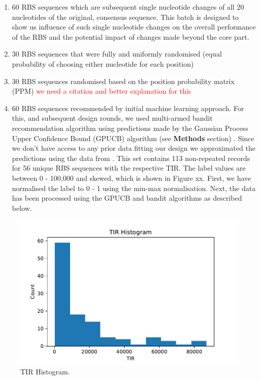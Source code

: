 \documentclass{article}
\begin{document}
\begin{enumerate}
    \item 60 RBS sequences which are subsequent single nucleotide changes of all 20 nucleotides of the original, consensus sequence. This batch is designed to show us influence of such single nucleotide changes on the overall performance of the RBS and the potential impact of changes made beyond the core part.
    \item 30 RBS sequences that were fully and uniformly randomised (equal probability of choosing either nucleotide for each position) 
    \item 30 RBS sequences randomised based on the position probability matrix (PPM) \textcolor{red}{we need a citation and better explanation for this}  
    \item 60 RBS sequences recommended by initial machine learning approach. For this, and subsequent design rounds, we used multi-armed bandit recommendation algorithm using predictions made by the Gaussian Process Upper Confidence Bound (GPUCB) algorithm (see \textbf{Methods} section) \cite{srinivas2012information}. Since we don't have access to any prior data fitting our design we approximated the predictions using the data from \textcite{jervis2018machine}. This set contains 113 non-repeated records for 56 unique RBS sequences with the respective TIR. The label values are between 0 - 100,000 and skewed, which is shown in Figure xx. First, we have normalised the label to 0 - 1 using the min-max normalisation. Next, the data has been processed using the GPUCB and bandit algorithms as described below.
\end{enumerate}{}

\begin{figure}[t]
    \centering
    \includegraphics[scale=0.7]{plots/TIR_histogram.pdf}
    \caption{TIR Histogram.}
    \label{fig: TIR Histogram.}
\end{figure}
\end{document}
